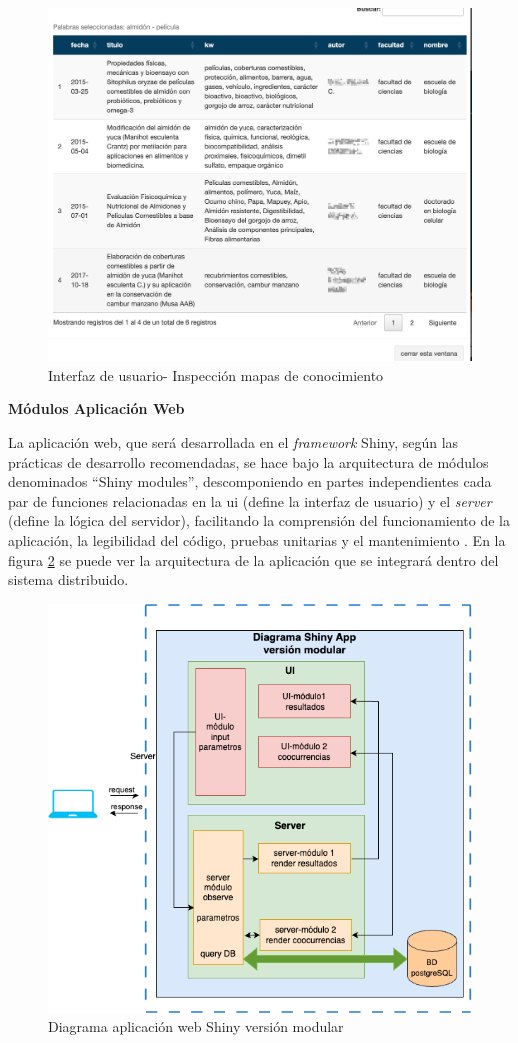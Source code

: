\documentclass[
  12pt,
  openany]{book}
\begin{document}
\begin{enumerate}
  \begin{figure}

  {\centering \includegraphics[width=0.6\linewidth]{images/05-desarrollo/4_ciclo/UI/uiinspeccionmapas} 

  }

  \caption{Interfaz de usuario- Inspección mapas de conocimiento }\label{fig:detallemc}
  \end{figure}
\end{enumerate}

\textbf{Módulos Aplicación Web}

La aplicación web, que será desarrollada en el \emph{framework} Shiny, según las prácticas de desarrollo recomendadas, se hace bajo la arquitectura de módulos denominados ``Shiny modules'', descomponiendo en partes independientes cada par de funciones relacionadas en la ui (define la interfaz de usuario) y el \emph{server} (define la lógica del servidor), facilitando la comprensión del funcionamiento de la aplicación, la legibilidad del código, pruebas unitarias y el mantenimiento \citep{wickham2021}. En la figura \ref{fig:shinymodulo} se puede ver la arquitectura de la aplicación que se integrará dentro del sistema distribuido.

\begin{figure}

{\centering \includegraphics[width=0.6\linewidth]{images/05-desarrollo/4_ciclo/digrama_shinyapp_modulos} 

}

\caption{Diagrama aplicación web Shiny versión modular}\label{fig:shinymodulo}
\end{figure}
\end{document}
